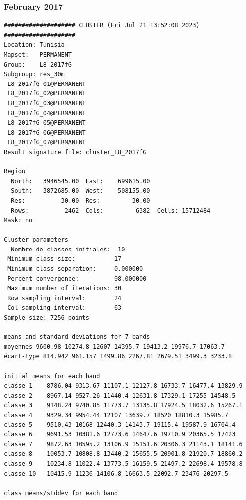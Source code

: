\documentclass[land,article,submit,pdftex,moreauthors]{Definitions/mdpi}
\begin{document}
\subsubsection[\appendixname~\thesubsubsection]{February 2017}
\begin{scriptsize}
\begin{verbatim}
#################### CLUSTER (Fri Jul 21 13:52:08 2023) ####################
Location: Tunisia
Mapset:   PERMANENT
Group:    L8_2017fG
Subgroup: res_30m
 L8_2017fG_01@PERMANENT
 L8_2017fG_02@PERMANENT
 L8_2017fG_03@PERMANENT
 L8_2017fG_04@PERMANENT
 L8_2017fG_05@PERMANENT
 L8_2017fG_06@PERMANENT
 L8_2017fG_07@PERMANENT
Result signature file: cluster_L8_2017fG

Region
  North:   3946545.00  East:    699615.00
  South:   3872685.00  West:    508155.00
  Res:          30.00  Res:         30.00
  Rows:          2462  Cols:         6382  Cells: 15712484
Mask: no

Cluster parameters
  Nombre de classes initiales: 	10
 Minimum class size:           17
 Minimum class separation:     0.000000
 Percent convergence:          98.000000
 Maximum number of iterations: 30
 Row sampling interval:        24
 Col sampling interval:        63
Sample size: 7256 points

means and standard deviations for 7 bands
moyennes 9600.98 10274.8 12607 14395.7 19413.2 19976.7 17063.7
écart-type 814.942 961.157 1499.86 2267.81 2679.51 3499.3 3233.8

initial means for each band
classe 1    8786.04 9313.67 11107.1 12127.8 16733.7 16477.4 13829.9
classe 2    8967.14 9527.26 11440.4 12631.8 17329.1 17255 14548.5
classe 3    9148.24 9740.85 11773.7 13135.8 17924.5 18032.6 15267.1
classe 4    9329.34 9954.44 12107 13639.7 18520 18810.3 15985.7
classe 5    9510.43 10168 12440.3 14143.7 19115.4 19587.9 16704.4
classe 6    9691.53 10381.6 12773.6 14647.6 19710.9 20365.5 17423
classe 7    9872.63 10595.2 13106.9 15151.6 20306.3 21143.1 18141.6
classe 8    10053.7 10808.8 13440.2 15655.5 20901.8 21920.7 18860.2
classe 9    10234.8 11022.4 13773.5 16159.5 21497.2 22698.4 19578.8
classe 10   10415.9 11236 14106.8 16663.5 22092.7 23476 20297.5

class means/stddev for each band


\end{verbatim}
\end{scriptsize}
\end{document}
